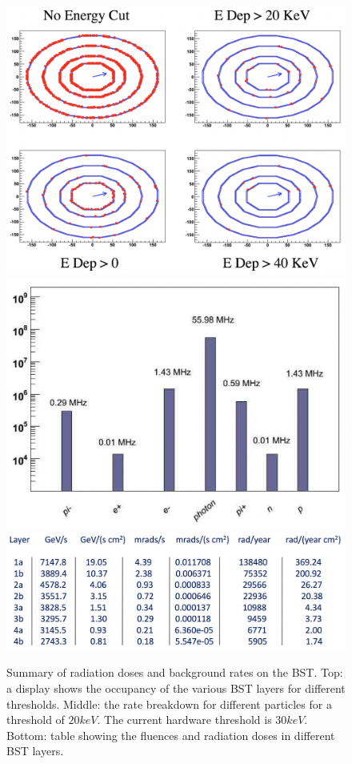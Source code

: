 \begin{figure}
	\centering
	\includegraphics[width=0.95\columnwidth,keepaspectratio]{img/bstHitDisplay.png}
	\includegraphics[width=0.95\columnwidth,keepaspectratio]{img/bstRates.png}
	\includegraphics[width=0.95\columnwidth,keepaspectratio]{img/bstRadSummary.png}
	\caption{Summary of radiation doses and background rates on the BST. Top: a display shows the occupancy of the various BST layers
            for different thresholds. Middle: the rate breakdown for different particles for a threshold of $20 keV$.
            The current hardware threshold is $30 keV$. Bottom: table showing the fluences and radiation doses in different BST
            layers. }
	\label{fig:bstHitSharing}
\end{figure}



